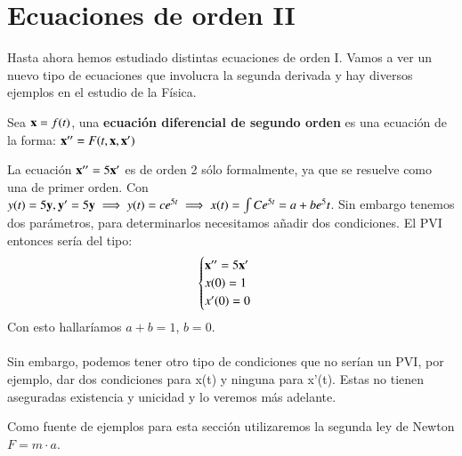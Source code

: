 
\section{Ecuaciones de orden II}
Hasta ahora hemos estudiado distintas ecuaciones de orden I. Vamos a ver un nuevo tipo de ecuaciones que involucra la segunda derivada y hay diversos ejemplos en el estudio de la Física.

\begin{dfn}
    Sea $\mathbf{x} = f(t)$, una \textbf{ecuación diferencial de segundo orden} es una ecuación de la forma: $\mathbf{x}'' = F(t, \mathbf{x}, \mathbf{x}')$
\end{dfn}

\begin{obs}
    La ecuación $\mathbf{x}'' = 5\mathbf{x}'$ es de orden 2 sólo formalmente, ya que se resuelve como una de primer orden. Con $y(t) = 5\mathbf{y}, \mathbf{y}' = 5\mathbf{y} \implies y(t) = ce^{5t} \implies x(t) = \int C e^{5t} = a + b e^5t$. Sin embargo tenemos dos parámetros, para determinarlos necesitamos añadir dos condiciones. El PVI entonces sería del tipo:
    $$
        \begin{cases}
            \mathbf{x}'' = 5\mathbf{x}'\\
            x(0) = 1\\
            x'(0) = 0
        \end{cases}
    $$
    Con esto hallaríamos $a+b = 1$, $b=0$.\\\\
    Sin embargo, podemos tener otro tipo de condiciones que no serían un PVI, por ejemplo, dar dos condiciones para x(t) y ninguna para x'(t). Estas no tienen aseguradas existencia y unicidad y lo veremos más adelante.
\end{obs}

Como fuente de ejemplos para esta sección utilizaremos la segunda ley de Newton $F = m\cdot a$.

